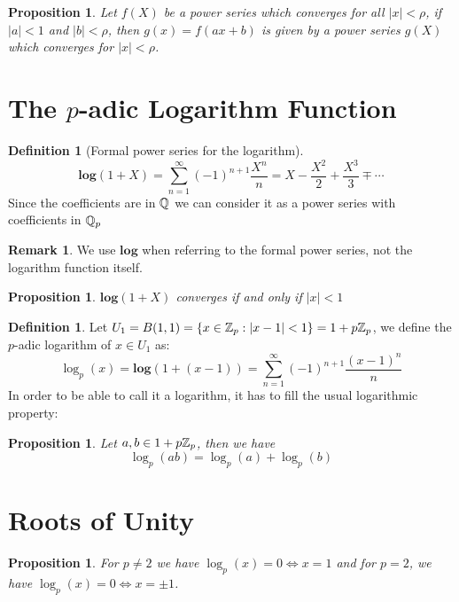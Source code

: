 \documentclass{article}
\theoremstyle{plain}
\newtheorem{prop}[thm]{Proposition}
\theoremstyle{definition}
\newtheorem{defi}[thm]{Definition}
\newtheorem{rem}[thm]{Remark}
\begin{document}
	\begin{minipage}[t]{0.45\textwidth}
		\begin{prop}
		Let $f(X)$ be a power series which converges for all $|x| < \rho$, if $|a| < 1$ and $|b| < \rho$, then $g(x) = f(ax+b)$ is given by a power series $g(X)$ which converges for $|x| < \rho$.
		\end{prop}
		\section{The $p$-adic Logarithm Function}
		\begin{defi}[Formal power series for the logarithm]   $$\mathbf{log}(1+X) = \sum_{n=1}^{\infty} (-1)^{n+1}\frac {X^{n}}{n} = X - \frac{X^{2}}{2} + \frac{X^{3}}{3} \mp \cdots$$
		Since the coefficients are in $\Bbb Q$ we can consider it as a power series with coefficients in $\Bbb Q_{p}$
		\end{defi}
		\begin{rem}
		We use $\mathbf{log}$ when referring to the formal power series, not the logarithm function itself.
		\end{rem}
		\begin{prop} $\mathbf{log}(1+X)$ converges if and only if $|x| < 1$
		\end{prop}
		\begin{defi}Let $U_{1} = B(1,1) = \{x \in \Bbb Z_{p} : |x-1| < 1\} = 1+p\Bbb Z_{p}$, we define the $p$-adic logarithm of $x \in U_{1}$ as:
		$$\log_{p}(x) = \mathbf{log}(1+(x-1)) = \sum_{n=1}^{\infty} (-1)^{n+1}\frac {(x-1)^{n}}{n}$$
		In order to be able to call it a logarithm, it has to fill the usual logarithmic property:
		\end{defi}
		\begin{prop}
		Let $a, b \in 1+p\Bbb Z_{p}$, then we have
		$$\log_{p}(ab) = \log_{p}(a) + \log_{p}(b)$$
		\end{prop}
		\section{Roots of Unity}
		\begin{prop}
		For $p \neq 2$ we have $\log_{p}(x)=0 \iff x=1$ and for $p = 2$, we have $\log_{p}(x)=0 \iff x= \pm 1$.
		\end{prop}
	\end{minipage}%
	\hfill
\end{document}
